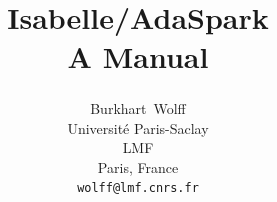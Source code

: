 \documentclass[abstract=on,fontsize=10pt,a4paper,mpinclude=true,
oneside,
pagesize,DIV=14]{scrartcl}
\title{Isabelle/AdaSpark\\[.3em]\large A Manual}
\author{
Burkhart~Wolff\textsuperscript{\orcidlink{0000-0002-9648-7663}}\\\small
Universit\'e Paris-Saclay\\
LMF\\
Paris, France\\
\texttt{wolff@lmf.cnrs.fr}
}
\date{}
\begin{document}
\renewcommand{\sectionautorefname}{Section}
\renewcommand{\subsectionautorefname}{Section}
\renewcommand{\subsubsectionautorefname}{Section}

\maketitle



\printbibliography
\end{document}
